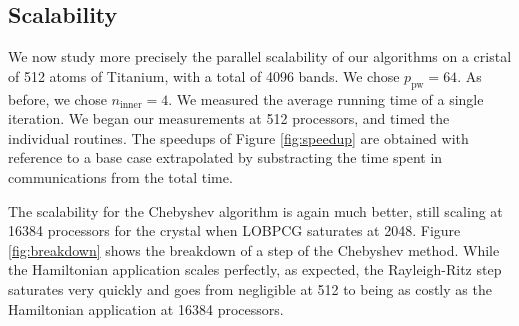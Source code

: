 \documentclass[11pt]{elsarticle}
\newcommand{\nline}{\ensuremath{n_{\text{inner}}}\xspace}
\newcommand{\nppw}{\ensuremath{p_{\text{pw}}}\xspace}
\begin{document}

\subsection{Scalability}
We now study more precisely the parallel scalability of our algorithms
on a cristal of 512 atoms of Titanium, with a total of 4096 bands. We
chose $\nppw = 64$. As before, we chose \nline $ = 4$. We
measured the average running time of a single iteration. We began our
measurements at 512 processors, and timed the individual routines. The
speedups of Figure \ref{fig:speedup} are obtained with reference to a
base case extrapolated by substracting the time spent in
communications from the total time.

The scalability for the Chebyshev algorithm is again much better,
still scaling at 16384 processors for the  crystal when LOBPCG
saturates at 2048. Figure \ref{fig:breakdown} shows the breakdown of
a step of the Chebyshev method. While the Hamiltonian application
scales perfectly, as expected, the Rayleigh-Ritz step saturates very
quickly and goes from negligible at 512 to being as costly as the
Hamiltonian application at 16384 processors.
\end{document}
